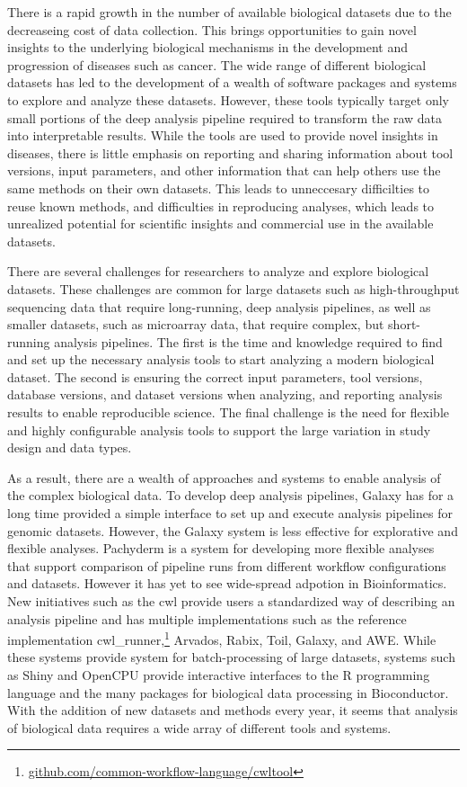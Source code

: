 There is a rapid growth in the number of available biological datasets due to
the decreaseing cost of data collection.  This brings opportunities to gain
novel insights to the underlying biological mechanisms in the development and
progression of diseases such as cancer.  The wide range of different biological
datasets has led to the development of a wealth of software packages and systems
to explore and analyze these datasets.  However, these tools typically target
only small portions of the deep analysis pipeline required to transform the raw
data into interpretable results. While the tools are used to provide novel
insights in diseases, there is little emphasis on reporting and sharing
information about tool versions, input parameters, and other information that
can help others use the same methods on their own datasets. This leads to
unneccesary difficilties to reuse known methods, and difficulties in reproducing
analyses, which leads to unrealized potential for scientific insights and
commercial use in the available datasets. 

There are several challenges for researchers to analyze and explore biological
datasets. These challenges are common for large datasets such as high-throughput
sequencing data that require long-running, deep analysis pipelines, as well as
smaller datasets, such as microarray data, that require complex, but
short-running analysis pipelines.  The first is the time and knowledge required
to find and set up the necessary analysis tools to start analyzing a modern
biological dataset.  The second is ensuring the correct input parameters, tool
versions, database versions, and dataset versions when analyzing, and reporting
analysis results to enable reproducible science. The final challenge is the need
for flexible and highly configurable analysis tools to support the large
variation in study design and data types.

As a result, there are a wealth of approaches and systems to enable analysis of
the complex biological data. To develop deep analysis pipelines,
Galaxy\cite{galaxy} has for a long time provided a simple interface to set up
and execute analysis pipelines for genomic datasets. However, the Galaxy system
is less effective for explorative and flexible
analyses.\cite{spjuth2015experiences} Pachyderm is a system for
developing more flexible analyses that support comparison of pipeline runs from
different workflow configurations and datasets.\cite{pachyderm} However it has
yet to see wide-spread adpotion in Bioinformatics.  New initiatives such as the
\gls{cwl} provide users a standardized way of describing an analysis pipeline
and has multiple implementations such as the reference implementation
cwl\_runner,\footnote{\url{github.com/common-workflow-language/cwltool}}
Arvados,\cite{arvados} Rabix,\cite{rabix} Toil,\cite{toil} Galaxy,\cite{galaxy}
and AWE.\cite{awe} While these systems provide system for batch-processing of
large datasets, systems such as Shiny and OpenCPU provide interactive interfaces
to the R programming language and the many packages for biological data
processing in Bioconductor.  With the addition of new datasets and methods every
year, it seems that analysis of biological data requires a wide array of
different tools and systems.

